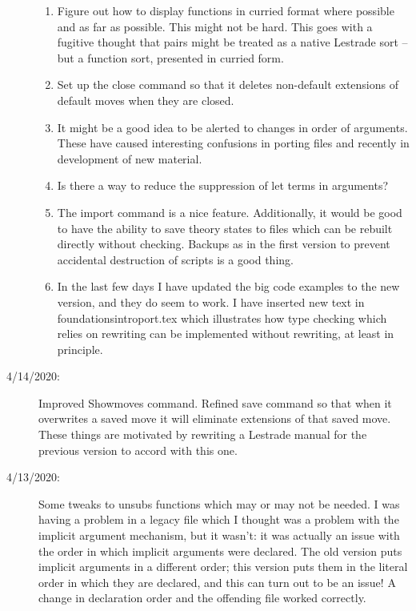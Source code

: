 \documentclass[12pt]{article}
\begin{document}
\begin{description}
\begin{enumerate}
\item Figure out how to display functions in curried format where possible and as far as possible.  This might not be hard.  This goes with a fugitive thought that pairs
might be treated as a native Lestrade sort -- but a function sort, presented in curried form.



\item Set up the close command so that it deletes non-default extensions of default moves when they are closed.

\item It might be a good idea to be alerted to changes in order of arguments.  These have caused interesting confusions in porting files and recently in development of new material.

\item Is there a way to reduce the suppression of let terms in arguments?

\item The import command is a nice feature.  Additionally, it would be good to have the ability to save theory states to files which can be rebuilt directly without checking.  Backups as in the first version to prevent accidental destruction of scripts is a good thing.

\item In the last few days I have updated the big code examples to the new version, and they do seem to work.   I have inserted new text in foundationsintroport.tex which illustrates
how type checking which relies on rewriting can be implemented without rewriting, at least in principle.

\end{enumerate}

\item[4/14/2020:]  Improved Showmoves command.  Refined save command so that when it overwrites a saved move
it will eliminate extensions of that saved move.  These things are motivated by rewriting a Lestrade manual for the previous version to accord with this one.

\item[4/13/2020:]  Some tweaks to unsubs functions which may or may not be needed.  I was having a problem in a legacy file which I thought was a problem with the implicit argument mechanism, but it wasn't:  it was actually an issue with the order in which implicit arguments were declared.  The old version puts implicit arguments in a different order;  this version puts them in the literal order in which they are declared, and this can turn out to be an issue!  A change in declaration order and the offending file worked correctly.


\end{description}
\end{document}
